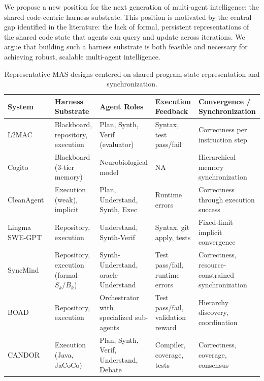 \documentclass{llmxive}
\providecommand{\arraystretch}{1.15}
\begin{document}
We propose a new position for the next generation of multi-agent
intelligence: the shared code-centric harness substrate. This
position is motivated by the central gap identified in the
literature: the lack of formal, persistent representations of the
shared code state that agents can query and update across
iterations. We argue that building such a harness substrate is
both feasible and necessary for achieving robust, scalable
multi-agent intelligence.



\begin{table}[t]
\centering
\renewcommand{\arraystretch}{1.16}
\setlength{\tabcolsep}{4pt}
\footnotesize
\begin{tabularx}{\textwidth}{@{}
  >{\arraybackslash}p{2.55cm}
  >{\arraybackslash}p{3.05cm}
  >{\arraybackslash}p{3.15cm}
  >{\arraybackslash}p{3.05cm}
  >{\arraybackslash}X@{}}
\toprule
\textbf{System}
& \textbf{Harness Substrate}
& \textbf{Agent Roles}
& \textbf{Execution Feedback}
& \textbf{Convergence / Synchronization} \\
\midrule
L2MAC~\cite{Holt2023L2MAC}
& Blackboard, repository, execution
& Plan, Synth, Verif (evaluator)
& Syntax, test pass/fail
& Correctness per instruction step \\ \midrule
Cogito~\cite{Li2025Cogito}
& Blackboard (3-tier memory)
& Neurobiological model
& NA
& Hierarchical memory synchronization \\ \midrule
CleanAgent~\cite{Qi2024CleanAgent}
& Execution (weak), implicit
& Plan, Understand, Synth, Exec
& Runtime errors
& Correctness through execution success \\ \midrule
Lingma SWE-GPT~\cite{Ma2024Lingma}
& Repository, execution
& Understand, Synth-Verif
& Syntax, git apply, tests
& Fixed-limit implicit convergence \\ \midrule
SyncMind~\cite{Guo2025SyncMind}
& Repository, execution (formal $S_k/B_k$)
& Synth-Understand, oracle Understand
& Test pass/fail, runtime errors
& Correctness, resource-constrained synchronization \\ \midrule
BOAD~\cite{xu2025boad}
& Repository, execution
& Orchestrator with specialized sub-agents
& Test pass/fail, validation reward
& Hierarchy discovery, coordination \\ \midrule
CANDOR~\cite{Xu2025Hallucination}
& Execution (Java, JaCoCo)
& Plan, Synth, Verif, Understand, Debate
& Compiler, coverage, tests
& Correctness, coverage, consensus \\
\bottomrule
\end{tabularx}
\caption{Representative MAS designs centered on shared program-state representation and synchronization.}
\label{tab:mas_world_state_systems}
\end{table}
\end{document}
